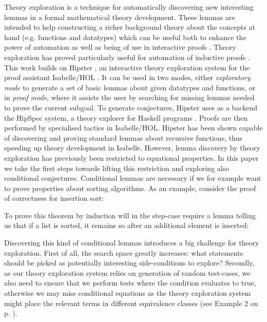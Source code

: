 \label{sec:intro}

Theory exploration is a technique for automatically discovering new interesting lemmas in a formal mathematical theory development.
%
These lemmas are intended to help constructing a richer background theory about the concepts at hand (e.g. functions and datatypes) which can be useful both to enhance the power of automation as well as being of use in interactive proofs \cite{mathsaid,isacosy,isascheme}.
%
Theory exploration has proved particularly useful for automation of inductive proofs \cite{hipspecCADE}. This work builds on Hipster \cite{hipster}, an interactive theory exploration system for the proof assistant Isabelle/HOL \cite{isabelle}.
%
It can be used in two modes, either \emph{exploratory mode} to generate a set of basic lemmas about given datatypes and functions, or in \emph{proof mode}, where it assists the user by searching for missing lemmas needed to prove the current subgoal.
%
To generate conjectures, Hipster uses as a backend the HipSpec system, a theory explorer for Haskell programs \cite{hipspecCADE}.
%
Proofs are then performed by specialised tactics in Isabelle/HOL. Hipster has been shown capable of discovering and proving standard lemmas about recursive functions, thus speeding up theory development in Isabelle.
%
However, lemma discovery by theory exploration has previously been restricted to equational properties.
%
In this paper we take the first steps towards lifting this restriction and exploring also conditional conjectures.
%
Conditional lemmas are necessary if we for example want to prove properties about sorting algorithms.
%
As an example, consider the proof of correctness for insertion sort:
%
\begin{center}
\end{center}
%
To prove this theorem by induction will in the step-case require a lemma telling us that if a list is sorted, it remains so after an additional element is inserted:
%
\begin{center}		
\end{center}
%
Discovering this kind of conditional lemmas introduces a big challenge for theory exploration.
%
First of all, the search space greatly increases: what statements should be picked as potentially interesting side-conditions to explore?
%
Secondly, as our theory exploration system relies on generation of random test-cases, we also need to ensure that we perform tests where the condition evaluates to true, otherwise we may miss conditional equations as the theory exploration system might place the relevant terms in different equivalence classes (see Example 2 on p. \pageref{example2}).

